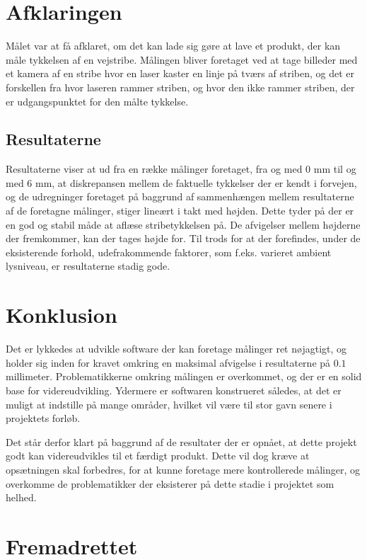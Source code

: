 \section{Afklaringen}
Målet var at få afklaret, om det kan lade sig gøre at lave et produkt, der kan måle tykkelsen af en vejstribe.
Målingen bliver foretaget ved at tage billeder med et kamera af en stribe hvor en laser kaster en linje på tværs af striben, og det er forskellen fra hvor laseren rammer striben, og hvor den ikke rammer striben, der er udgangspunktet for den målte tykkelse.

\subsection{Resultaterne}
Resultaterne viser at ud fra en række målinger foretaget, fra og med 0 mm til og med 6 mm, at diskrepansen mellem de faktuelle tykkelser der er kendt i forvejen, og de udregninger foretaget på baggrund af sammenhængen mellem resultaterne af de foretagne målinger, stiger lineært i takt med højden. Dette tyder på der er en god og stabil måde at aflæse stribetykkelsen på. De afvigelser mellem højderne der fremkommer, kan der tages højde for. Til trods for at der forefindes, under de eksisterende forhold, udefrakommende faktorer, som f.eks. varieret ambient lysniveau, er resultaterne stadig gode.

\section{Konklusion}
Det er lykkedes at udvikle software der kan foretage målinger ret nøjagtigt, og holder sig inden for kravet omkring en maksimal afvigelse i resultaterne på $0.1$ millimeter. Problematikkerne omkring målingen er overkommet, og der er en solid base for videreudvikling. Ydermere er softwaren konstrueret således, at det er muligt at indstille på mange områder, hvilket vil være til stor gavn senere i projektets forløb.

Det står derfor klart på baggrund af de resultater der er opnået, at dette projekt godt kan videreudvikles til et færdigt produkt. Dette vil dog kræve at opsætningen skal forbedres, for at kunne foretage mere kontrollerede målinger, og overkomme de problematikker der eksisterer på dette stadie i projektet som helhed.

\newpage

\section{Fremadrettet}

